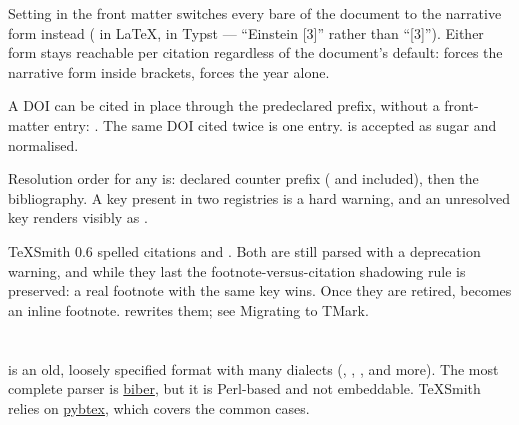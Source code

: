 \documentclass[a4paper,twoside]{article}
\begin{document}
Setting  in the front matter
switches every bare  of the document to the narrative form instead
( in \LaTeX{},  in Typst --- \enquote{Einstein [3]}
rather than \enquote{[3]}). Either form stays reachable per citation regardless of the
document's default:  forces the narrative form inside brackets,
 forces the year alone.

A DOI can be cited in place through the predeclared  prefix, without a
front-matter entry: . The same DOI cited twice is
one entry.  is accepted as sugar and normalised.

Resolution order for any  is: declared counter prefix ( and 
included), then the bibliography. A key present in two registries is a hard
warning, and an unresolved key renders visibly as \tscodeinline{[?key]}.
\begin{tscallout}[kind=note, title={The footnote spelling is deprecated}]
TeXSmith 0.6 spelled citations \tscodeinline{[\^{}key]} and \tscodeinline{\^{}[k1,k2]}. Both are still
parsed with a deprecation warning, and while they last the
footnote-versus-citation shadowing rule is preserved: a real footnote with
the same key wins. Once they are retired, \tscodeinline{\^{}[…]} becomes an inline
footnote.  rewrites them; see
Migrating to TMark.
\end{tscallout}
\section{}
 is an old, loosely specified format with many dialects (, , , and more). The most complete parser is \href{https://en.wikipedia.org/wiki/Biber\_(LaTeX)}{biber}, but it is Perl-based and not embeddable. TeXSmith relies on \href{https://pybtex.org/}{pybtex}, which covers the common cases.
\end{document}
